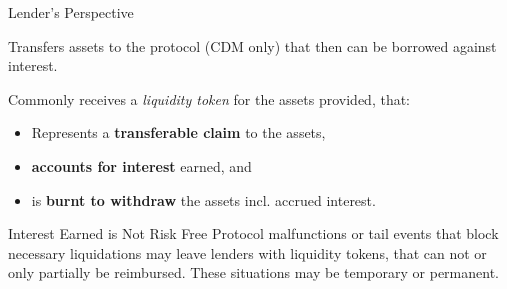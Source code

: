 \documentclass[]{beamer}
\begin{document}
\begin{frame}{Lender's Perspective}

Transfers assets to the protocol (CDM only) that then can be borrowed against interest.

\vspace{1.0em}

Commonly receives a \emph{liquidity token} for the assets provided, that:
\vspace{0.5em}
\begin{itemize}
  \item Represents a \textbf{transferable claim} to the assets,
  \item \textbf{accounts for interest} earned, and
  \item is \textbf{burnt to withdraw} the assets incl. accrued interest.
\end{itemize}

 {
\vspace{1.0em}
\begin{keytakeaway}{Interest Earned is Not Risk Free}
	Protocol malfunctions or tail events that block necessary liquidations may leave lenders with liquidity tokens, that can not or only partially be reimbursed. These situations may be temporary or permanent.
\end{keytakeaway}
}

\end{frame}
\end{document}
